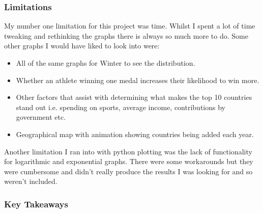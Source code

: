 \documentclass[a4 paper, 12pt]{article}
\begin{document}
        \subsubsection{Limitations}
        My number one limitation for this project was time. Whilst I spent a lot of time tweaking and rethinking the graphs there is always so much more to do. Some other graphs I would have liked to look into were:
            \begin{itemize}
                \item All of the same graphs for Winter to see the distribution.
                \item Whether an athlete winning one medal increases their likelihood to win more.
                \item Other factors that assist with determining what makes the top 10 countries stand out i.e. spending on sports, average income, contributions by government etc.
                \item Geographical map with animation showing countries being added each year.
            \end{itemize}
        Another limitation I ran into with python plotting was the lack of functionality for logarithmic and exponential graphs. There were some workarounds but they were cumbersome and didn't really produce the results I was looking for and so weren't included. 



        \subsubsection{Key Takeaways}
\end{document}
